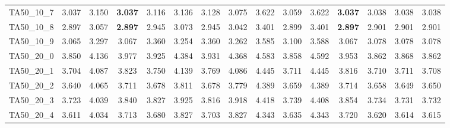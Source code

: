 \begin{tabular}{cc||ccccccccccccc}
TA50\_10\_7        & 3.037            & 3.150            & {\bf 3.037}      & 3.116            & 3.136            & 3.128            & 3.075            & 3.622            & 3.059            & 3.622            & {\bf 3.037}      & 3.038            & 3.038            & 3.038           \\ 
TA50\_10\_8        & 2.897            & 3.057            & {\bf 2.897}      & 2.945            & 3.073            & 2.945            & 3.042            & 3.401            & 2.899            & 3.401            & {\bf 2.897}      & 2.901            & 2.901            & 2.901           \\ 
TA50\_10\_9        & 3.065            & 3.297            & 3.067            & 3.360            & 3.254            & 3.360            & 3.262            & 3.585            & 3.100            & 3.588            & 3.067            & 3.078            & 3.078            & 3.078           \\ 
TA50\_20\_0        & 3.850            & 4.136            & 3.977            & 3.925            & 4.384            & 3.931            & 4.368            & 4.583            & 3.858            & 4.592            & 3.953            & 3.862            & 3.868            & 3.862           \\ 
TA50\_20\_1        & 3.704            & 4.087            & 3.823            & 3.750            & 4.139            & 3.769            & 4.086            & 4.445            & 3.711            & 4.445            & 3.816            & 3.710            & 3.711            & 3.708           \\ 
TA50\_20\_2        & 3.640            & 4.065            & 3.711            & 3.678            & 3.811            & 3.678            & 3.779            & 4.389            & 3.659            & 4.389            & 3.714            & 3.658            & 3.649            & 3.650           \\ 
TA50\_20\_3        & 3.723            & 4.039            & 3.840            & 3.827            & 3.925            & 3.816            & 3.918            & 4.418            & 3.739            & 4.408            & 3.854            & 3.734            & 3.731            & 3.732           \\ 
TA50\_20\_4        & 3.611            & 4.034            & 3.713            & 3.680            & 3.827            & 3.703            & 3.827            & 4.343            & 3.635            & 4.343            & 3.720            & 3.620            & 3.614            & 3.615           \\ 

\end{tabular}
